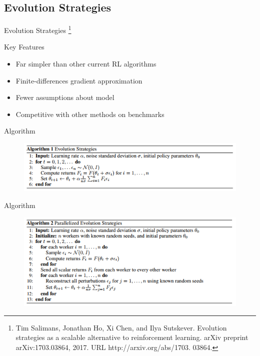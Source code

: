 \documentclass{beamer}
\begin{document}
	\subsection*{Evolution Strategies}
	
	\begin{frame}
		\Huge Evolution Strategies
		\footnote{Tim Salimans, Jonathan Ho, Xi Chen, and Ilya Sutskever. Evolution strategies as a scalable alternative to
reinforcement learning. arXiv preprint arXiv:1703.03864, 2017. URL http://arxiv.org/abs/1703.
03864.}
	\end{frame}
	
	\begin{frame}{Key Features}
		\begin{itemize}
			\item Far simpler than other current RL algorithms
			\item Finite-differences gradient approximation
			\item Fewer assumptions about model
			\item Competitive with other methods on benchmarks
		\end{itemize}
	\end{frame}
	
	\begin{frame}{Algorithm}
		\begin{figure}
			\centering
			\includegraphics[width=1.2\textheight]{es_algorithm.png}
		\end{figure}
	\end{frame}
	
	\begin{frame}{Algorithm}
		\begin{figure}
			\centering
			\includegraphics[width=1.2\textheight]{es_parallel.png}
		\end{figure}
	\end{frame}
	
\end{document}
